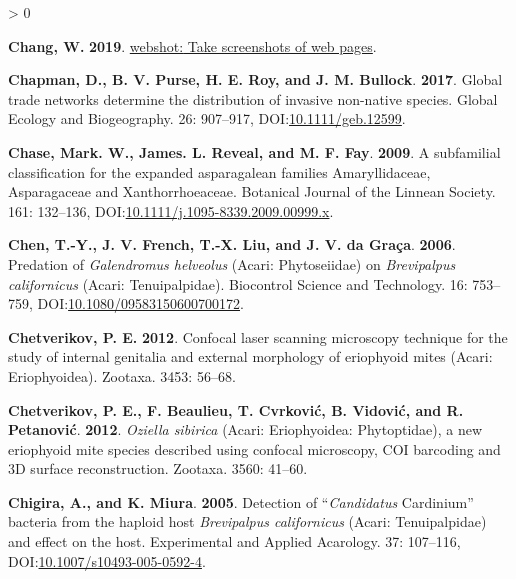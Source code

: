 \documentclass{ufdissertation}[overrideChapters] %
\newlength{\cslhangindent}
\newenvironment{CSLReferences}[2] %
 {%
  \setlength{\parindent}{0pt}
  \ifodd #1 \everypar{\setlength{\hangindent}{\cslhangindent}}\ignorespaces\fi
  \ifnum #2 > 0
  \setlength{\parskip}{#2\baselineskip}
  \fi
 }%
 {}
\begin{document}
{\begin{CSLReferences}{1}{1}
\leavevmode{}%
\textbf{Chang, W.} \textbf{2019}. \href{https://CRAN.R-project.org/package=webshot}{{webshot:} Take screenshots of web pages}.

\leavevmode{}%
\textbf{Chapman, D., B. V. Purse, H. E. Roy, and J. M. Bullock}. \textbf{2017}. Global trade networks determine the distribution of invasive non-native species. Global Ecology and Biogeography. 26: 907--917, DOI:\href{https://doi.org/10.1111/geb.12599}{10.1111/geb.12599}.

\leavevmode{}%
\textbf{Chase, Mark. W., James. L. Reveal, and M. F. Fay}. \textbf{2009}. A subfamilial classification for the expanded asparagalean families {Amaryllidaceae}, {Asparagaceae} and {Xanthorrhoeaceae}. Botanical Journal of the Linnean Society. 161: 132--136, DOI:\href{https://doi.org/10.1111/j.1095-8339.2009.00999.x}{10.1111/j.1095-8339.2009.00999.x}.

\leavevmode{}%
\textbf{Chen, T.-Y., J. V. French, T.-X. Liu, and J. V. da Graça}. \textbf{2006}. Predation of {\emph{Galendromus helveolus}} ({Acari}: {Phytoseiidae}) on {\emph{Brevipalpus californicus}} ({Acari}: {Tenuipalpidae}). Biocontrol Science and Technology. 16: 753--759, DOI:\href{https://doi.org/10.1080/09583150600700172}{10.1080/09583150600700172}.

\leavevmode{}%
\textbf{Chetverikov, P. E.} \textbf{2012}. Confocal laser scanning microscopy technique for the study of internal genitalia and external morphology of eriophyoid mites ({Acari}: {Eriophyoidea}). Zootaxa. 3453: 56--68.

\leavevmode{}%
\textbf{Chetverikov, P. E., F. Beaulieu, T. Cvrković, B. Vidović, and R. Petanović}. \textbf{2012}. {\emph{Oziella sibirica}} ({Acari}: {Eriophyoidea}: {Phytoptidae}), a new eriophyoid mite species described using confocal microscopy, {COI} barcoding and {3D} surface reconstruction. Zootaxa. 3560: 41--60.

\leavevmode{}%
\textbf{Chigira, A., and K. Miura}. \textbf{2005}. Detection of {``{\emph{Candidatus}} {Cardinium}''} bacteria from the haploid host {\emph{Brevipalpus californicus}} ({Acari}: {Tenuipalpidae}) and effect on the host. Experimental and Applied Acarology. 37: 107--116, DOI:\href{https://doi.org/10.1007/s10493-005-0592-4}{10.1007/s10493-005-0592-4}.


\end{CSLReferences}}
\end{document}
